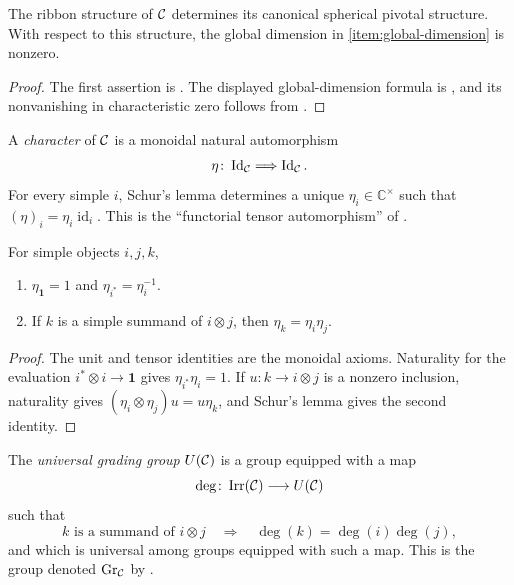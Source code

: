 \begin{proposition}
\label{prop:canonical-spherical-dimension}
The ribbon structure of $\mathcal{C}$ determines its canonical spherical pivotal
structure.  With respect to this structure, the global dimension in
\cref{item:global-dimension} is nonzero.
\end{proposition}

\begin{proof}
The first assertion is \cite[Proposition~8.10.12]{EGNO2015}.  The displayed
global-dimension formula is \cite[Equation~(8.53)]{EGNO2015}, and its
nonvanishing in characteristic zero follows from
\cite[Theorem~7.21.12]{EGNO2015}.
\end{proof}

\begin{definition}[Character]
\label{def:character}
A \emph{character} of $\mathcal{C}$ is a monoidal natural automorphism
\[
  \eta\colon\operatorname{Id}_{\mathcal{C}}\Longrightarrow
  \operatorname{Id}_{\mathcal{C}}.
\]
For every simple $i$, Schur's lemma determines a unique
$\eta_i\in\mathbb C^\times$ such that
$(\eta)_i=\eta_i\operatorname{id}_i$.
This is the ``functorial tensor automorphism'' of
\cite[Definition~1]{Yetter1993}.
\end{definition}

\begin{lemma}
\label{lem:character-identities}
For simple objects $i,j,k$,
\begin{enumerate}[label=(\roman*),ref=\roman*]
  \item\label{item:character-unit-dual}
  $\eta_{\mathbf 1}=1$ and $\eta_{i^*}=\eta_i^{-1}$.

  \item\label{item:character-fusion}
  If $k$ is a simple summand of $i\otimes j$, then
  $\eta_k=\eta_i\eta_j$.
\end{enumerate}
\end{lemma}

\begin{proof}
The unit and tensor identities are the monoidal axioms.  Naturality for the
evaluation $i^*\otimes i\to\mathbf 1$ gives
$\eta_{i^*}\eta_i=1$.  If $u\colon k\to i\otimes j$ is a nonzero inclusion,
naturality gives $(\eta_i\otimes\eta_j)u=u\eta_k$, and Schur's lemma gives
the second identity.
\end{proof}

\begin{definition}
\label{def:universal-grading-group}
The \emph{universal grading group} $U(\mathcal{C})$ is a group equipped with a map
\[
  \deg\colon\operatorname{Irr}(\mathcal{C})\longrightarrow U(\mathcal{C})
\]
such that
\[
  k\text{ is a summand of }i\otimes j
  \quad\Longrightarrow\quad
  \deg(k)=\deg(i)\deg(j),
\]
and which is universal among groups equipped with such a map.  This is the
group denoted $\operatorname{Gr}_{\mathcal{C}}$ by \cite[Definition~3]{Yetter1993}.
\end{definition}

